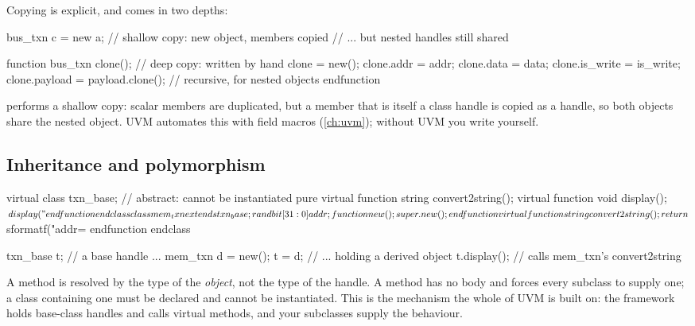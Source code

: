 Copying is explicit, and comes in two depths:

\begin{svcode}
bus_txn c = new a;          // shallow copy: new object, members copied
                            // ... but nested handles still shared

function bus_txn clone();   // deep copy: written by hand
  clone = new();
  clone.addr = addr; clone.data = data; clone.is_write = is_write;
  clone.payload = payload.clone();   // recursive, for nested objects
endfunction
\end{svcode}

 performs a shallow copy: scalar members are duplicated, but a
member that is itself a class handle is copied as a handle, so both objects
share the nested object. UVM automates this with field macros
(\cref{ch:uvm}); without UVM you write  yourself.

\subsection{Inheritance and polymorphism}

\begin{svcode}
virtual class txn_base;                 // abstract: cannot be instantiated
  pure virtual function string convert2string();
  virtual function void display();
    $display("%
  endfunction
endclass

class mem_txn extends txn_base;
  rand bit [31:0] addr;
  function new(); super.new(); endfunction
  virtual function string convert2string();
    return $sformatf("addr=%
  endfunction
endclass

txn_base t;                             // a base handle ...
mem_txn  d = new();
t = d;                                  // ... holding a derived object
t.display();                            // calls mem_txn's convert2string
\end{svcode}

A  method is resolved by the type of the \emph{object}, not the
type of the handle. A  method has no body and forces every
subclass to supply one; a class containing one must be declared
 and cannot be instantiated. This is the mechanism the whole
of UVM is built on: the framework holds base-class handles and calls virtual
methods, and your subclasses supply the behaviour.

